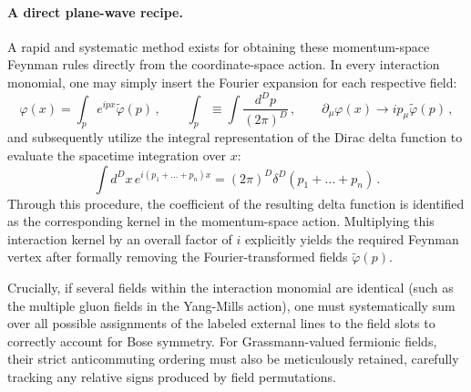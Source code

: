 \paragraph{A direct plane-wave recipe.}
A rapid and systematic method exists for obtaining these momentum-space Feynman rules directly from the coordinate-space action. In every interaction monomial, one may simply insert the Fourier expansion for each respective field:
\[
    \varphi(x) = \int_p e^{ipx} \tilde{\varphi}(p) \, , \qquad \int_p \equiv \int \frac{d^D p}{(2\pi)^D} \, , \qquad \partial_\mu \varphi(x) \rightarrow i p_\mu \tilde{\varphi}(p) \, ,
\]
and subsequently utilize the integral representation of the Dirac delta function to evaluate the spacetime integration over \(x\):
\[
    \int d^D x \, e^{i(p_1 + \dots + p_n)x} = (2\pi)^D \delta^D(p_1 + \dots + p_n) \, .
\]
Through this procedure, the coefficient of the resulting delta function is identified as the corresponding kernel in the momentum-space action. Multiplying this interaction kernel by an overall factor of \(i\) explicitly yields the required Feynman vertex after formally removing the Fourier-transformed fields \(\tilde{\varphi}(p)\).

Crucially, if several fields within the interaction monomial are identical (such as the multiple gluon fields in the Yang-Mills action), one must systematically sum over all possible assignments of the labeled external lines to the field slots to correctly account for Bose symmetry. For Grassmann-valued fermionic fields, their strict anticommuting ordering must also be meticulously retained, carefully tracking any relative signs produced by field permutations.

